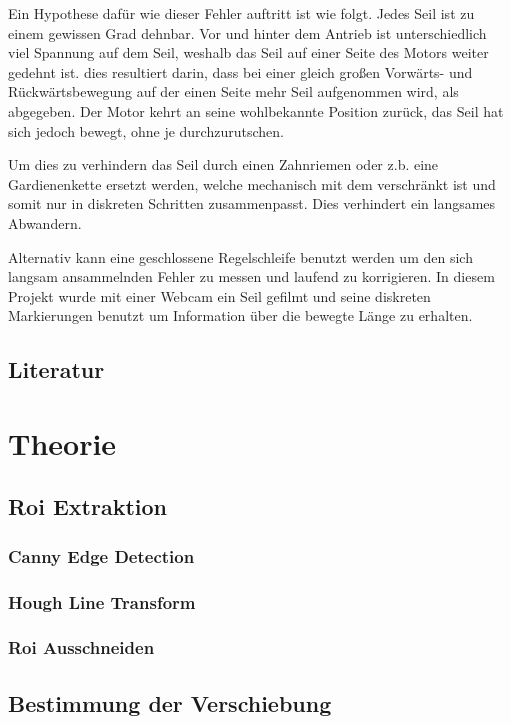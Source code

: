 \documentclass[10pt,a4paper]{scrreport}
\begin{document}
Ein Hypothese dafür wie dieser Fehler auftritt ist wie folgt. Jedes Seil ist zu einem gewissen Grad dehnbar. Vor und hinter dem Antrieb ist unterschiedlich viel Spannung auf dem Seil, weshalb 
das Seil auf einer Seite des Motors weiter gedehnt ist. dies resultiert darin, dass bei einer gleich großen Vorwärts- und Rückwärtsbewegung auf der einen Seite mehr Seil aufgenommen wird, als abgegeben. Der Motor kehrt an seine wohlbekannte Position zurück, das Seil hat sich jedoch bewegt, ohne je durchzurutschen.

Um dies zu verhindern das Seil durch einen Zahnriemen oder z.b. eine Gardienenkette ersetzt werden, welche mechanisch mit dem verschränkt ist und somit nur in diskreten Schritten zusammenpasst. Dies verhindert ein langsames Abwandern.

Alternativ kann eine geschlossene Regelschleife benutzt werden um den sich langsam ansammelnden Fehler zu messen und laufend zu korrigieren. In diesem Projekt wurde mit einer Webcam ein Seil gefilmt und seine diskreten Markierungen benutzt um Information über die bewegte Länge zu erhalten.

\subsection{Literatur}
	

\section{Theorie}

	\subsection{Roi Extraktion}
	
		\subsubsection{Canny Edge Detection}
		
		\subsubsection{Hough Line Transform}
		
		\subsubsection{Roi Ausschneiden}
		
	\subsection{Bestimmung der Verschiebung}
	
\end{document}
